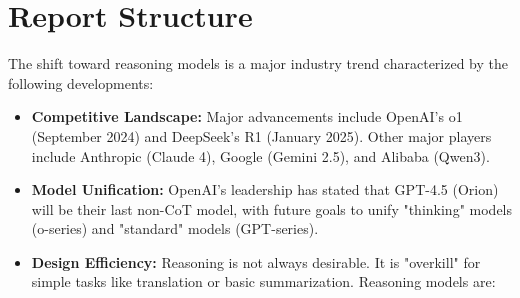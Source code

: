 ﻿\section{Report Structure}
\label{sec:report-structure}


The shift toward reasoning models is a major industry trend characterized by the following developments:
\begin{itemize}
    \item \textbf{Competitive Landscape:} Major advancements include OpenAI’s o1 (September 2024) and DeepSeek’s R1 (January 2025). Other major players include Anthropic (Claude 4), Google (Gemini 2.5), and Alibaba (Qwen3).
    \item \textbf{Model Unification:} OpenAI’s leadership has stated that GPT-4.5 (Orion) will be their last non-CoT model, with future goals to unify "thinking" models (o-series) and "standard" models (GPT-series).
    \item \textbf{Design Efficiency:} Reasoning is not always desirable. It is "overkill" for simple tasks like translation or basic summarization. Reasoning models are:
\end{itemize}